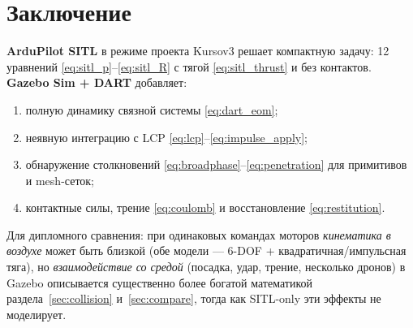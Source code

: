 \documentclass[a4paper,11pt]{article}
\begin{document}
\section*{Заключение}

\textbf{ArduPilot SITL} в режиме проекта Kursov3 решает компактную задачу:
12 уравнений \eqref{eq:sitl_p}--\eqref{eq:sitl_R} с тягой
\eqref{eq:sitl_thrust} и без контактов.
\textbf{Gazebo Sim + DART} добавляет:
\begin{enumerate}
  \item полную динамику связной системы \eqref{eq:dart_eom};
  \item неявную интеграцию с LCP \eqref{eq:lcp}--\eqref{eq:impulse_apply};
  \item обнаружение столкновений \eqref{eq:broadphase}--\eqref{eq:penetration}
  для примитивов и mesh-сеток;
  \item контактные силы, трение \eqref{eq:coulomb} и восстановление
  \eqref{eq:restitution}.
\end{enumerate}

Для дипломного сравнения: при одинаковых командах моторов
\textit{кинематика в воздухе} может быть близкой (обе модели --- 6-DOF +
квадратичная/импульсная тяга), но \textit{взаимодействие со средой}
(посадка, удар, трение, несколько дронов) в Gazebo описывается
существенно более богатой математикой раздела~\ref{sec:collision}
и~\ref{sec:compare}, тогда как SITL-only эти эффекты не моделирует.
\end{document}
